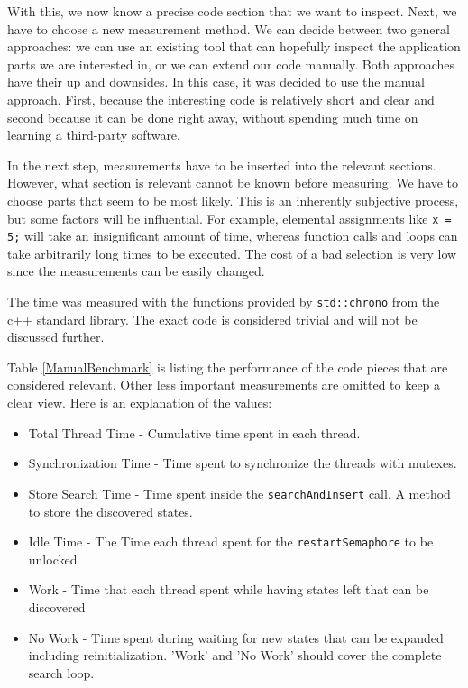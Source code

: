 With this, we now know a precise code section that we want to inspect. Next, we have to choose a new measurement method. We can decide between two general approaches: we can use an existing tool that can hopefully inspect the application parts we are interested in, or we can extend our code manually. Both approaches have their up and downsides. In this case, it was decided to use the manual approach. First, because the interesting code is relatively short and clear and second because it can be done right away, without spending much time on learning a third-party software.

In the next step, measurements have to be inserted into the relevant sections. However, what section is relevant cannot be known before measuring. We have to choose parts that seem to be most likely. This is an inherently subjective process, but some factors will be influential. For example, elemental assignments like \texttt{x = 5;} will take an insignificant amount of time, whereas function calls and loops can take arbitrarily long times to be executed. The cost of a bad selection is very low since the measurements can be easily changed.

The time was measured with the functions provided by \texttt{std::chrono} from the c++ standard library. The exact code is considered trivial and will not be discussed further.

Table \ref{ManualBenchmark} is listing the performance of the code pieces that are considered relevant. Other less important measurements are omitted to keep a clear view. Here is an explanation of the values:
\begin{itemize}
    \item Total Thread Time - Cumulative time spent in each thread.
    \item Synchronization Time - Time spent to synchronize the threads with mutexes.
    \item Store Search Time - Time spent inside the \texttt{searchAndInsert} call. A method to store the discovered states.
    \item Idle Time - The Time each thread spent for the \texttt{restartSemaphore} to be unlocked
    \item Work - Time that each thread spent while having states left that can be discovered
    \item No Work - Time spent during waiting for new states that can be expanded including reinitialization. 'Work' and  'No Work' should cover the complete search loop.
\end{itemize}

